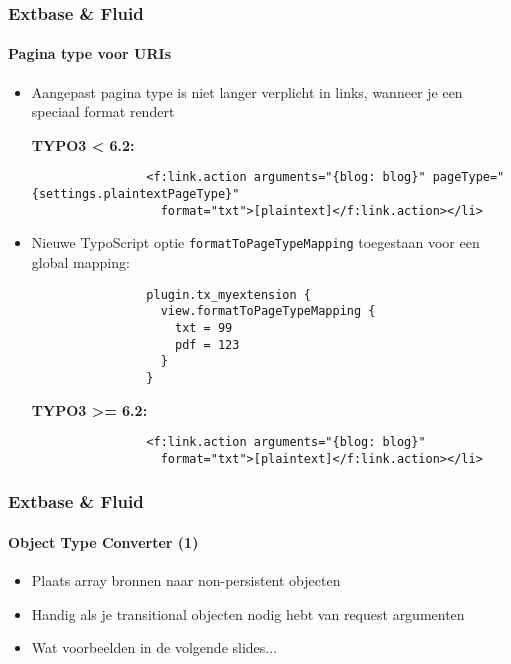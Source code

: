 
\begin{frame}[fragile]
	\frametitle{Extbase \& Fluid}
	\framesubtitle{Pagina type voor URIs}

	\lstset{
		basicstyle=\tiny\ttfamily
	}

	\begin{itemize}
		\item Aangepast pagina type  is niet langer verplicht in links, wanneer je een speciaal format rendert

			\smaller\textbf{TYPO3 < 6.2:}\normalsize
			\begin{lstlisting}
				<f:link.action arguments="{blog: blog}" pageType="{settings.plaintextPageType}"
				  format="txt">[plaintext]</f:link.action></li>
			\end{lstlisting}

		\item Nieuwe TypoScript optie \texttt{formatToPageTypeMapping} toegestaan voor een global mapping:

			\begin{lstlisting}
				plugin.tx_myextension {
				  view.formatToPageTypeMapping {
				    txt = 99
				    pdf = 123
				  }
				}
			\end{lstlisting}

			\smaller\textbf{TYPO3 >= 6.2:}\normalsize
			\begin{lstlisting}
				<f:link.action arguments="{blog: blog}"
				  format="txt">[plaintext]</f:link.action></li>
			\end{lstlisting}

	\end{itemize}

\end{frame}


\begin{frame}[fragile]
	\frametitle{Extbase \& Fluid}
	\framesubtitle{Object Type Converter (1)}

	\lstset{
		basicstyle=\tiny\ttfamily
	}

	\begin{itemize}
		\item Plaats array bronnen naar non-persistent objecten
		\item Handig als je transitional objecten nodig hebt van request argumenten 
		\item Wat voorbeelden in de volgende slides...

	\end{itemize}

\end{frame}

